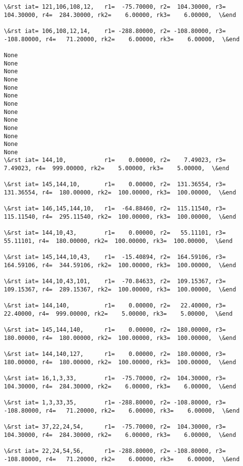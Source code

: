 \documentclass[11pt]{article}
\begin{document}
\begin{Verbatim}[commandchars=\\\{\}]
\&rst iat= 121,106,108,12,   r1=  -75.70000, r2=  104.30000, r3=  104.30000, r4=  284.30000, rk2=    6.00000, rk3=    6.00000,  \&end

\&rst iat= 106,108,12,14,    r1= -288.80000, r2= -108.80000, r3= -108.80000, r4=   71.20000, rk2=    6.00000, rk3=    6.00000,  \&end

None
None
None
None
None
None
None
None
None
None
None
None
None
\&rst iat= 144,10,           r1=    0.00000, r2=    7.49023, r3=    7.49023, r4=  999.00000, rk2=    5.00000, rk3=    5.00000,  \&end

\&rst iat= 145,144,10,       r1=    0.00000, r2=  131.36554, r3=  131.36554, r4=  180.00000, rk2=  100.00000, rk3=  100.00000,  \&end

\&rst iat= 146,145,144,10,   r1=  -64.88460, r2=  115.11540, r3=  115.11540, r4=  295.11540, rk2=  100.00000, rk3=  100.00000,  \&end

\&rst iat= 144,10,43,        r1=    0.00000, r2=   55.11101, r3=   55.11101, r4=  180.00000, rk2=  100.00000, rk3=  100.00000,  \&end

\&rst iat= 145,144,10,43,    r1=  -15.40894, r2=  164.59106, r3=  164.59106, r4=  344.59106, rk2=  100.00000, rk3=  100.00000,  \&end

\&rst iat= 144,10,43,101,    r1=  -70.84633, r2=  109.15367, r3=  109.15367, r4=  289.15367, rk2=  100.00000, rk3=  100.00000,  \&end

\&rst iat= 144,140,          r1=    0.00000, r2=   22.40000, r3=   22.40000, r4=  999.00000, rk2=    5.00000, rk3=    5.00000,  \&end

\&rst iat= 145,144,140,      r1=    0.00000, r2=  180.00000, r3=  180.00000, r4=  180.00000, rk2=  100.00000, rk3=  100.00000,  \&end

\&rst iat= 144,140,127,      r1=    0.00000, r2=  180.00000, r3=  180.00000, r4=  180.00000, rk2=  100.00000, rk3=  100.00000,  \&end

\&rst iat= 16,1,3,33,        r1=  -75.70000, r2=  104.30000, r3=  104.30000, r4=  284.30000, rk2=    6.00000, rk3=    6.00000,  \&end

\&rst iat= 1,3,33,35,        r1= -288.80000, r2= -108.80000, r3= -108.80000, r4=   71.20000, rk2=    6.00000, rk3=    6.00000,  \&end

\&rst iat= 37,22,24,54,      r1=  -75.70000, r2=  104.30000, r3=  104.30000, r4=  284.30000, rk2=    6.00000, rk3=    6.00000,  \&end

\&rst iat= 22,24,54,56,      r1= -288.80000, r2= -108.80000, r3= -108.80000, r4=   71.20000, rk2=    6.00000, rk3=    6.00000,  \&end


\end{Verbatim}
\end{document}

